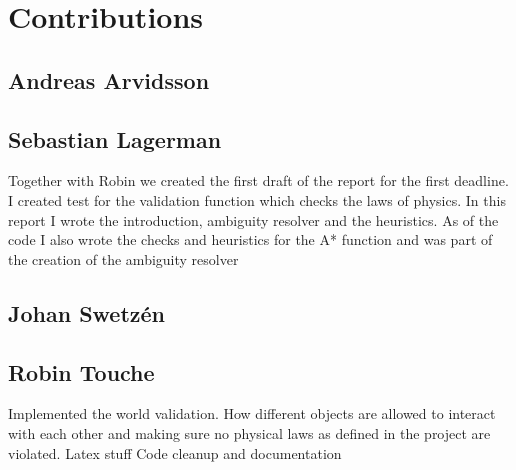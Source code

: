 \section*{Contributions}
\subsection*{Andreas Arvidsson}
\subsection*{Sebastian Lagerman}
Together with Robin we created the first draft of the report for the first deadline.
I created test for the validation function which checks the laws of physics.
In this report I wrote the introduction, ambiguity resolver and the heuristics.
As of the code I also wrote the checks and heuristics for the A* function and was part of the creation of the ambiguity resolver
\subsection*{Johan Swetz\'en}
\subsection*{Robin Touche}
Implemented the world validation.
How different objects are allowed to interact with each other and making sure no physical laws as defined in the project are violated.
Latex stuff
Code cleanup and documentation
